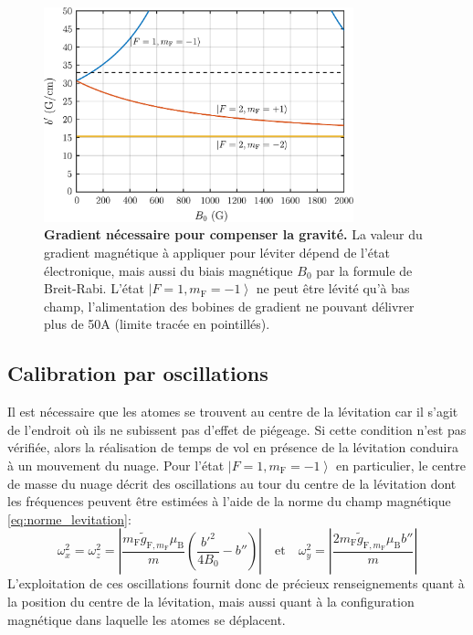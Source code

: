 \begin{figure}
\centering
\includegraphics[width=0.8\textwidth]{Fig/Modif_exp/levitation_etats.pdf}
\caption{\textbf{Gradient nécessaire pour compenser la gravité.} La valeur du gradient magnétique à appliquer pour léviter dépend de l'état électronique, mais aussi du biais magnétique $B_0$ par la formule de Breit-Rabi. L'état $\left| F=1, m_{\mathrm{F}}=-1 \right\rangle$ ne peut être lévité qu'à bas champ, l'alimentation des bobines de gradient ne pouvant délivrer plus de 50A (limite tracée en pointillés).}
\label{fig:levitation_etats}
\end{figure}




\subsection{Calibration par oscillations}
\label{sc:oscillations_levitation}
Il est nécessaire que les atomes se trouvent au centre de la lévitation car il s'agit de l'endroit où ils ne subissent pas d'effet de piégeage. Si cette condition n'est pas vérifiée, alors la réalisation de temps de vol en présence de la lévitation conduira à un mouvement du nuage. Pour l'état $\left| F=1, m_{\mathrm{F}}=-1 \right\rangle$ en particulier, le centre de masse du nuage décrit des oscillations au tour du centre de la lévitation dont les fréquences peuvent être estimées à l'aide de la norme du champ magnétique \ref{eq:norme_levitation}:
\begin{equation}
\omega_x^2=\omega_z^2=\left| \frac{m_{\mathrm{F}} \widetilde{g}_{\mathrm{F},m_{\mathrm{F}}} \mu_{\mathrm{B}}}{m} \left( \frac{b'^2}{4 B_0} - b'' \right) \right|
\quad \text{et} \quad
\omega_y^2= \left| \frac{2 m_{\mathrm{F}} \widetilde{g}_{\mathrm{F},m_{\mathrm{F}}} \mu_{\mathrm{B}} b''}{m} \right|
\end{equation}
L'exploitation de ces oscillations fournit donc de précieux renseignements quant à la position du centre de la lévitation, mais aussi quant à la configuration magnétique dans laquelle les atomes se déplacent.


